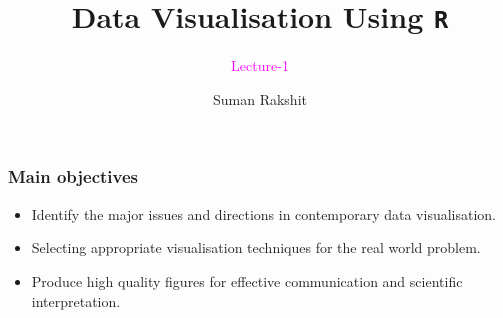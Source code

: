\documentclass{beamer}
\title[]{Data Visualisation Using \texttt{R}}
\subtitle{\textcolor{magenta}{Lecture-1}}
\author[]{Suman Rakshit} %
\institute[Scool of EECMS, Curtin University] %
{
	\textcolor{magenta}{Scool of EECMS, Curtin University} %
}
\begin{document}
\begin{frame}
	\titlepage %
\end{frame}







\begin{frame}[t]\frametitle{Main objectives}\vspace{5pt}
\begin{itemize}
\item Identify the major issues and directions in contemporary data visualisation.
\vspace{0.5in}
\item<2-> Selecting appropriate visualisation techniques for the real world problem.
\vspace{0.5in}
\item<3-> Produce high quality figures for effective communication and scientific interpretation.
\end{itemize}
\end{frame}

%
%
%
\end{document}
